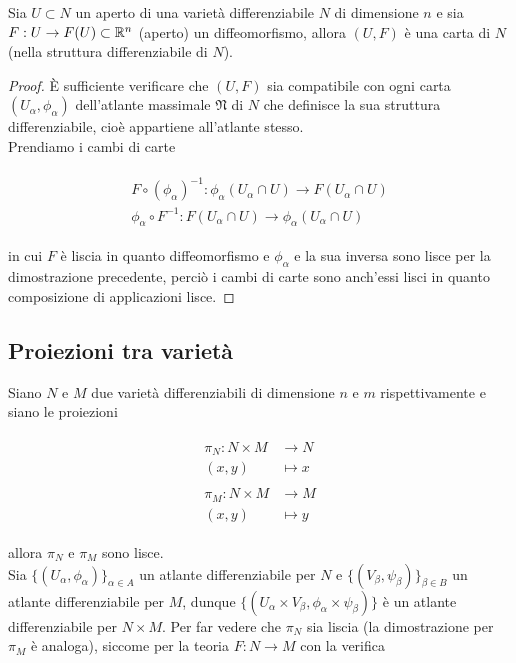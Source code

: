 \begin{definition}\label{diffeo-map}
	Sia $ U \subset N $ un aperto di una varietà differenziabile $ N $ di dimensione $ n $ e sia $ F : U \to F(U) \subset \mathbb{R}^{n} $ (aperto) un diffeomorfismo, allora $ (U,F) $ è una carta di $ N $ (nella struttura differenziabile di $ N $).
\end{definition}

\begin{proof}
	\`{E} sufficiente verificare che $ (U,F) $ sia compatibile con ogni carta $ (U_{\alpha},\phi_{\alpha}) $ dell'atlante massimale $ \mathfrak{N} $ di $ N $ che definisce la sua struttura differenziabile, cioè appartiene all'atlante stesso.\\
	Prendiamo i cambi di carte
	
	\begin{align}
		\begin{split}
			F \circ (\phi_{\alpha})^{-1} : \phi_{\alpha}(U_{\alpha} \cap U) \to F(U_{\alpha} \cap U)\\
			\phi_{\alpha} \circ F^{-1} : F(U_{\alpha} \cap U) \to \phi_{\alpha}(U_{\alpha} \cap U)
		\end{split}	
	\end{align}

	in cui $ F $ è liscia in quanto diffeomorfismo e $ \phi_{\alpha} $ e la sua inversa sono lisce per la dimostrazione precedente, perciò i cambi di carte sono anch'essi lisci in quanto composizione di applicazioni lisce.
\end{proof}

\subsection{Proiezioni tra varietà}

Siano $ N $ e $ M $ due varietà differenziabili di dimensione $ n $ e $ m $ rispettivamente e siano le proiezioni

\begin{align}
	\begin{split}
		\pi_{N} : N \times M &\to N\\
		(x,y) &\mapsto x\\\\
		\pi_{M} : N \times M &\to M\\
		(x,y) &\mapsto y
	\end{split}	
\end{align}

allora $ \pi_{N} $ e $ \pi_{M} $ sono lisce.\\
Sia $ \{(U_{\alpha},\phi_{\alpha})\}_{\alpha \in A} $ un atlante differenziabile per $ N $ e $ \{(V_{\beta},\psi_{\beta})\}_{\beta \in B} $ un atlante differenziabile per $ M $, dunque $ \{(U_{\alpha} \times V_{\beta},\phi_{\alpha} \times \psi_{\beta})\} $ è un atlante differenziabile per $ N \times M $. Per far vedere che $ \pi_{N} $ sia liscia (la dimostrazione per $ \pi_{M} $ è analoga), siccome per la teoria $ F : N \to M $ con la verifica

